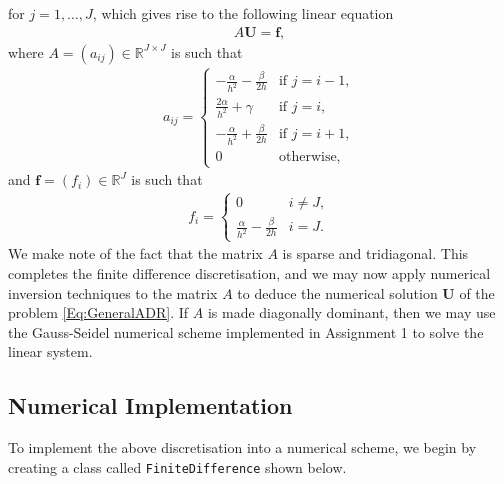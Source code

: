 \documentclass[a4paper,11pt]{article}
\theoremstyle{break}
\theoremstyle{break2}
\theoremstyle{break}
\theoremstyle{break2}
\newcommand{\R}{\mathbb{R}}
\begin{document}
for $ j = 1, \ldots, J $, which gives rise to the following linear equation
\begin{align}\label{Eq:LinearSystem}
A\mathbf{U} = \mathbf{f},
\end{align}
where $ A = (a_{ij}) \in \R^{J \times J} $ is such that
\begin{align*}
a_{ij} =
\begin{cases}
-\frac{\alpha}{h^2} - \frac{\beta}{2h} & \text{if } j = i-1, \\
\frac{2\alpha}{h^2} + \gamma & \text{if } j = i, \\
-\frac{\alpha}{h^2} + \frac{\beta}{2h} & \text{if } j = i+1, \\
0 & \text{otherwise,}
\end{cases}
\end{align*}
and $ \mathbf{f} = (f_i) \in \R^{J} $ is such that 
\begin{align*}
f_i =
\begin{cases}
0 & i \neq J, \\
\frac{\alpha}{h^2} - \frac{\beta}{2h} & i = J.
\end{cases}
\end{align*}
We make note of the fact that the matrix $ A $ is sparse and tridiagonal. This completes the finite difference discretisation, and we may now apply numerical inversion techniques to the matrix $ A $ to deduce the numerical solution $ \mathbf{U} $ of the problem \eqref{Eq:GeneralADR}. If $ A $ is made diagonally dominant, then we may use the Gauss-Seidel numerical scheme implemented in Assignment 1 to solve the linear system. 

\subsection{Numerical Implementation}
To implement the above discretisation into a numerical scheme, we begin by creating a class called \texttt{FiniteDifference} shown below.
\end{document}
